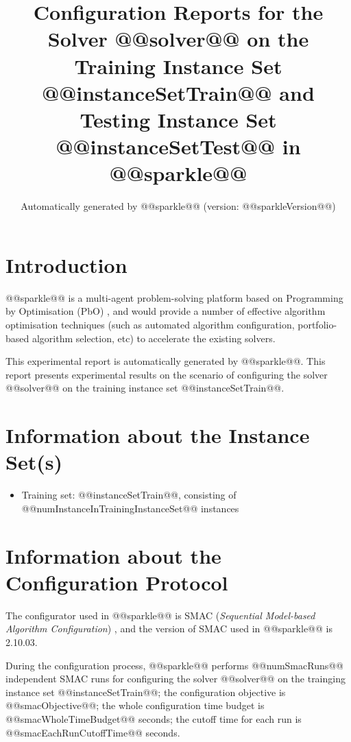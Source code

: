 \documentclass[british]{article}
\title{Configuration Reports for the Solver @@solver@@ on the Training Instance Set @@instanceSetTrain@@ \iftest and Testing Instance Set @@instanceSetTest@@ \fi in @@sparkle@@ }
\author{ Automatically generated by @@sparkle@@ (version: @@sparkleVersion@@) }
\newif\iftest
\begin{document}
\maketitle %


\section{Introduction}
\label{sec:Introduction}

@@sparkle@@ \cite{Hoos15} is a multi-agent problem-solving platform based on Programming by Optimisation (PbO) \cite{Hoos12}, and would provide a number of effective algorithm optimisation techniques (such as automated algorithm configuration, portfolio-based algorithm selection, etc) to accelerate the existing solvers.

This experimental report is automatically generated by @@sparkle@@. This report presents experimental results on the scenario of configuring the solver @@solver@@ on the training instance set @@instanceSetTrain@@\iftest~and evaluating it on the testing instance set @@instanceSetTest@@\fi.

\section{Information about the Instance Set(s)}

\begin{itemize}
\item Training set: @@instanceSetTrain@@, consisting of @@numInstanceInTrainingInstanceSet@@ instances
\iftest\item Testing set: @@instanceSetTest@@, consisting of @@numInstanceInTestingInstanceSet@@ instances\fi
\end{itemize}

\section{Information about the Configuration Protocol}

The configurator used in @@sparkle@@ is SMAC ({\em Sequential Model-based Algorithm Configuration}) \cite{HutEtAl11}, and the version of SMAC used in @@sparkle@@ is 2.10.03.

During the configuration process, @@sparkle@@ performs @@numSmacRuns@@ independent SMAC runs for configuring the solver @@solver@@ on the trainging instance set @@instanceSetTrain@@; the configuration objective is @@smacObjective@@; the whole configuration time budget is @@smacWholeTimeBudget@@ seconds; the cutoff time for each run is @@smacEachRunCutoffTime@@ seconds.
\end{document}
